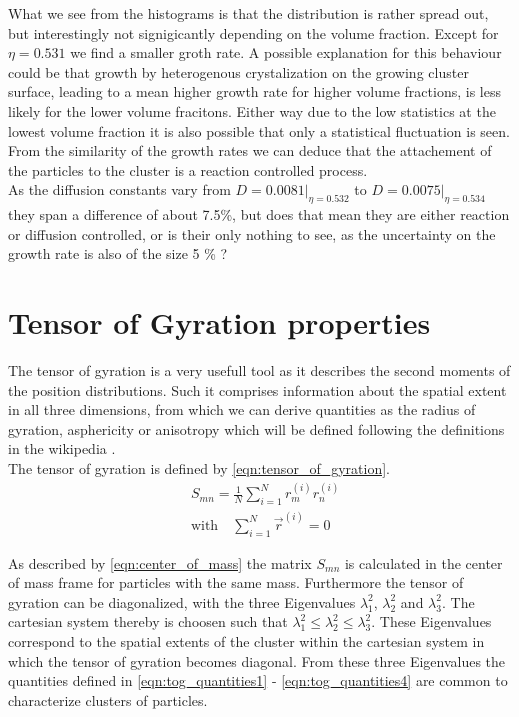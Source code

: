 What we see from the histograms is that the distribution is rather spread out, but interestingly not signigicantly depending on the volume fraction. Except for $\eta = 0.531$ we find a smaller groth rate. A possible explanation for this behaviour could be that growth by heterogenous crystalization on the growing cluster surface, leading to a mean higher growth rate for higher volume fractions, is less likely for the lower volume fracitons. Either way due to the low statistics at the lowest volume fraction it is also possible that only a statistical fluctuation is seen. From the similarity of the growth rates we can deduce that the attachement of the particles to the cluster is a reaction controlled process.  \\

As the diffusion constants vary from $D=0.0081|_{\eta = 0.532}$ to $D=0.0075|_{\eta = 0.534}$ they span a difference of about 7.5\%, but does that mean they are either reaction or diffusion controlled, or is their only nothing to see, as the uncertainty on the growth rate is also of the size 5 \% ?

\section{Tensor of Gyration properties}
\label{sec:tog}
The tensor of gyration is a very usefull tool as it describes the second moments of the position distributions. Such it comprises information about the spatial extent in all three dimensions, from which we can derive quantities as the radius of gyration, asphericity or anisotropy which will be defined following the definitions in the wikipedia .\\

The tensor of gyration is defined by \autoref{eqn:tensor_of_gyration}.
\begin{align}
\label{eqn:tensor_of_gyration}
&S_{mn}=\frac{1}{N} \sum_{i=1}^{N} r^{(i)}_m r^{(i)}_n\\
\label{eqn:center_of_mass}
&\text{with} \quad \sum_{i=1}^{N} \vec{r}^{(i)} = 0
\end{align}

As described by \autoref{eqn:center_of_mass} the matrix $S_{mn}$ is calculated in the center of mass frame for particles with the same mass. Furthermore the tensor of gyration can be diagonalized, with the three Eigenvalues $\lambda_1^2$, $\lambda_2^2$ and $\lambda_3^2$. The cartesian system thereby is choosen such that $\lambda_1^2 \leq \lambda_2^2 \leq \lambda_3^2 $. These Eigenvalues correspond to the spatial extents of the cluster within the cartesian system in which the tensor of gyration becomes diagonal. From these three Eigenvalues the quantities defined in \autoref{eqn:tog_quantities1} - \ref{eqn:tog_quantities4} are common to characterize clusters of particles.

